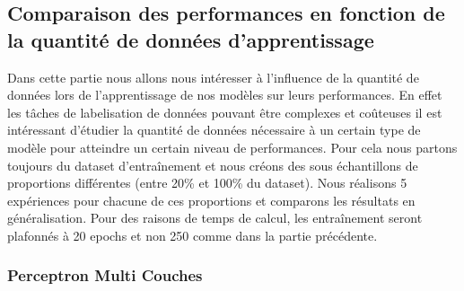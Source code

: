 \documentclass[12pt]{article}
\begin{document}
\subsection{Comparaison des performances en fonction de la quantité de données d'apprentissage}

Dans cette partie nous allons nous intéresser à l'influence de la quantité de données lors de l'apprentissage 
de nos modèles sur leurs performances. En effet les tâches de labelisation de données pouvant être complexes et coûteuses
il est intéressant d'étudier la quantité de données nécessaire à un certain type de modèle pour atteindre un certain niveau 
de performances.
Pour cela nous partons toujours du dataset d'entraînement et nous créons des sous échantillons de proportions 
différentes (entre 20\% et 100\% du dataset). Nous réalisons 5 expériences pour chacune de ces proportions et comparons les 
résultats en généralisation. Pour des raisons de temps de calcul, les entraînement seront plafonnés à 20 epochs et non 250 comme 
dans la partie précédente.

\subsubsection{Perceptron Multi Couches}
\end{document}
